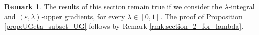 \documentclass[12pt]{amsart}
\newcommand{\R}{\mathbb{R}}
\newcommand{\sfd}{{\sf d}}
\newcommand{\X}{{\rm X}}
\newcommand{\lip}{{\rm lip}}
\newtheorem{lemma}[theorem]{Lemma}
\theoremstyle{definition}
\newtheorem{remark}[theorem]{Remark}
\newcommand{\sfc}{{\sf c}}
\newcommand{\Chain}[1]{\mathscr{C}^{#1}}
\renewcommand{\sl}[1]{{\rm sl}_{#1}}
\newcommand{\UG}[1]{{\rm UG}^{#1}}
\begin{document}
\begin{remark}
\label{rmk:section_4_for_lambda_true}
    The results of this section remain true if we consider the $\lambda$-integral and $(\varepsilon,\lambda)$-upper gradients, for every $\lambda \in [0,1]$. The proof of Proposition \ref{prop:UGeta_subset_UG} follows by Remark \ref{rmk:section_2_for_lambda}.
\end{remark}


\end{document}
